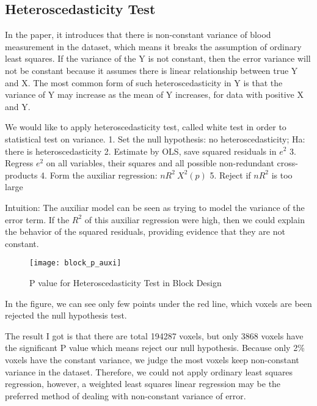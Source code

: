 \subsection{Heteroscedasticity Test}
In the paper, it introduces that there is non-constant variance of blood 
measurement in the dataset, which means it breaks the assumption of ordinary 
least squares. If the variance of the Y is not constant, then the error variance
will not be constant because it assumes there is linear relationship between 
true Y and X. The most common form of such heteroscedasticity in Y is that the 
variance of Y may increase as the mean of Y increases, for data with positive X
and Y.

We would like to apply heteroscedasticity test, called white test in order to 
statistical test on variance.
1. Set the null hypothesis: no heteroscedasticity; Ha: there is heteroscedasticity
2. Estimate by OLS, save squared residuals in $e^2$
3. Regress $e^2$ on all variables, their squares and all possible non-redundant cross-products
4. Form the auxiliar regression: $n R^2 ~ X^2(p)$
5. Reject if $n R^2$ is too large

Intuition: The auxiliar model can be seen as trying to model the variance of 
the error term. If the $R^2$ of this auxiliar regression were high, then we could
explain the behavior of the squared residuals, providing evidence that they are
not constant.

\begin{figure}[h]
\centering
\texttt{[image: block\_p\_auxi]}
\caption{P value for Heteroscedasticity Test in Block Design}
\end{figure}

In the figure, we can see only few points under the red line, which voxels are
been rejected the null hypothesis test. 

The result I got is that there are total 194287 voxels, but only 3868 voxels 
have the significant P value which means reject our null hypothesis. Because 
only 2\% voxels have the constant variance, we judge the most voxels keep 
non-constant variance in the dataset. Therefore, we could not apply ordinary 
least squares regression, however, a weighted least squares linear regression 
may be the preferred method of dealing with non-constant variance of error.

